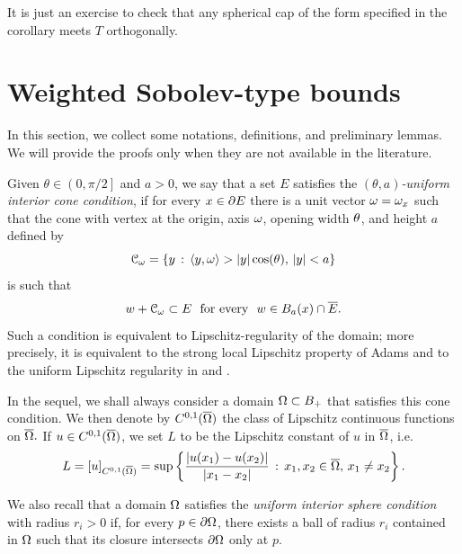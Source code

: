 \documentclass[a4paper,10pt]{amsart}
\numberwithin{equation}{section}
\begin{document}
\begin{rem}
{\rm
It is just an exercise to check that any spherical cap of the form specified in the corollary meets $T$ orthogonally.
}\end{rem}

\section{Weighted Sobolev-type bounds }
\label{sec:preliminary-estimates}

In this section, we collect some notations, definitions, and preliminary lemmas. We will provide the proofs only when they are not available in the literature.
\par
Given $\theta \in \left( 0, \pi /2 \right]$ and $a >0$, we say that a set $E$ satisfies the \textit{$(\theta, a )$-uniform interior cone condition}, if for every $x \in \partial E$ there is a unit vector $\omega=\omega_x$ such that the cone with vertex at the origin, axis $\omega$, opening width $\theta$, and height $a$ defined by
$$
\mathcal{C}_{\omega}=\left\{ y \, : \, \langle y , \omega \rangle > |y| \cos(\theta) , \, |y|<a \right\}
$$
is such that
\begin{equation}\label{def:cone strong}
w + \mathcal{C}_{\omega}  \subset E \ \text{ for every } \ w \in B_a (x) \cap \overline{E} .
\end{equation}
Such a condition is equivalent to Lipschitz-regularity of the domain; more precisely, it is equivalent to the strong local Lipschitz property of Adams \cite[Pag 66]{Ad} and to the uniform Lipschitz regularity in \cite[Section III]{Ch} and \cite[Definition 2.1]{Ru}.
\par
In the sequel, we shall always consider a domain $\Omega\subset B_+$ that satisfies this cone condition.
We then denote by $C^{0, 1} (\overline{\Omega})$ the class of Lipschitz continuous functions on $\overline{\Omega}.$  If $u\in C^{0, 1} (\overline{\Omega})$, we set $L$ to be the Lipschitz constant of $u$ in $\overline{\Omega}$, i.e.
\begin{equation}
\label{eq:seminorm}
	L = \left[ u \right]_{C^{0,1}(\overline{\Omega})} = \sup \left\{ \frac{|u(x_1) - u(x_2)|}{|x_1 - x_2|} \, : \,  x_1,x_2 \in \overline{\Omega}, \, x_1 \neq x_2 \right\}.
\end{equation}
\par
We also recall that a domain $\Omega$ satisfies the \textit{uniform interior sphere condition} with radius $r_i>0$ if, for every $p \in \partial \Omega$, there exists a ball of radius $r_i$ contained in $\Omega$  such that its closure intersects $\partial \Omega$ only at $p$.
%
\end{document}
